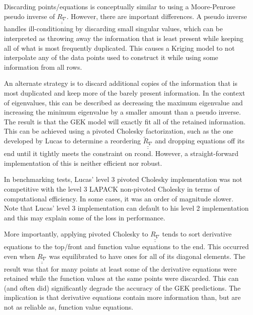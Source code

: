 Discarding points/equations is conceptually similar to using a
Moore-Penrose pseudo inverse of $\underline{\underline{R_{\nabla}}}$.
However, there are important differences.  A pseudo inverse handles 
ill-conditioning by discarding small singular values, which can be 
interpreted as throwing away the information that is least present 
while keeping all of what is most frequently duplicated.  This causes 
a Kriging model to not interpolate any of the data points used to 
construct it while using some information from all rows.\newline

An alternate strategy is to discard additional copies of the 
information that is most duplicated and keep more of the barely 
present information.  In the context of eigenvalues, this can be 
described as decreasing the maximum eigenvalue and increasing the 
minimum eigenvalue by a smaller amount than a pseudo inverse.  The 
result is that the GEK model will exactly fit all of the retained 
information.  This can be achieved using a pivoted Cholesky factorization, 
such as the one developed by Lucas \cite{Luc04} to determine 
a reordering $\underline{\underline{\tilde{R}_{\nabla}}}$ and 
dropping equations off its end until it tightly meets the 
constraint on rcond.  However, a straight-forward implementation 
of this is neither efficient nor robust.\newline  

In benchmarking tests, Lucas' level 3 pivoted Cholesky 
implementation was not competitive with the level 3 LAPACK 
non-pivoted Cholesky in terms of computational efficiency.  In 
some cases, it was an order of magnitude slower.  Note that 
Lucas' level 3 implementation can default to his level 2 
implementation and this may explain some of the loss in 
performance.\newline

More importantly, applying pivoted Cholesky to 
$\underline{\underline{R_{\nabla}}}$ tends to sort derivative 
equations to the top/front and function value equations to the 
end.  This occurred even when $\underline{\underline{R_{\nabla}}}$ 
was equilibrated to have ones for all of its diagonal elements.  
The result was that for many points at least some of the 
derivative equations were retained while the function values at 
the same points were discarded.  This can (and often did) 
significantly degrade the accuracy of the GEK predictions.  The 
implication is that derivative equations contain more information 
than, but are not as reliable as, function value equations.\newline

